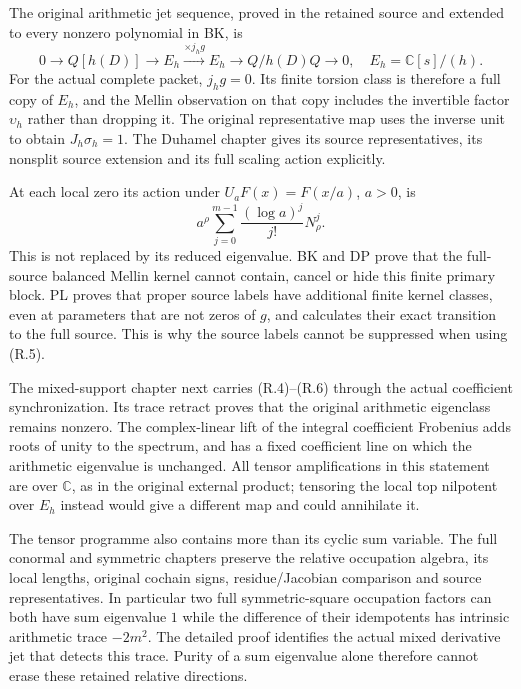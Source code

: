 The original arithmetic jet sequence, proved in the retained source
and extended to every nonzero polynomial in BK, is
\[
0\longrightarrow Q[h(D)]\longrightarrow E_h
\xrightarrow{\times j_hg}E_h
\longrightarrow Q/h(D)Q\longrightarrow0,
\quad E_h=\mathbb C[s]/(h).                            \tag{R.5}
\]
For the actual complete packet, $j_hg=0$. Its finite torsion class is
therefore a full copy of $E_h$, and the Mellin observation on that copy
includes the invertible factor $\upsilon_h$ rather than dropping it.
The original representative map uses the inverse unit to obtain
$J_h\sigma_h=1$. The Duhamel chapter gives its source representatives,
its nonsplit source extension and its full scaling action explicitly.

At each local zero its action under $U_aF(x)=F(x/a)$, $a>0$, is
\[
a^\rho\sum_{j=0}^{m-1}\frac{(\log a)^j}{j!}N_\rho^j.
                                                               \tag{R.6}
\]
This is not replaced by its reduced eigenvalue. BK and DP prove that
the full-source balanced Mellin kernel cannot contain, cancel or hide
this finite primary block. PL proves that proper source labels have
additional finite kernel classes, even at parameters that are not zeros
of $g$, and calculates their exact transition to the full source. This
is why the source labels cannot be suppressed when using (R.5).

The mixed-support chapter next carries (R.4)--(R.6) through the actual
coefficient synchronization. Its trace retract proves that the original
arithmetic eigenclass remains nonzero. The complex-linear lift of the
integral coefficient Frobenius adds roots of unity to the spectrum, and
has a fixed coefficient line on which the arithmetic eigenvalue is
unchanged. All tensor amplifications in this statement are over
$\mathbb C$, as in the original external product; tensoring the local
top nilpotent over $E_h$ instead would give a different map and could
annihilate it.

The tensor programme also contains more than its cyclic sum variable.
The full conormal and symmetric chapters preserve the relative
occupation algebra, its local lengths, original cochain signs,
residue/Jacobian comparison and source representatives. In particular
two full symmetric-square occupation factors can both have sum
eigenvalue $1$ while the difference of their idempotents has intrinsic
arithmetic trace $-2m^2$. The detailed proof identifies the actual mixed
derivative jet that detects this trace. Purity of a sum eigenvalue alone
therefore cannot erase these retained relative directions.

